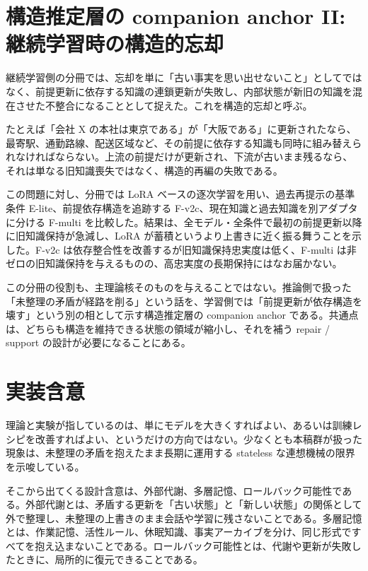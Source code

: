 \documentclass[12pt,a4paper]{article}
\begin{document}
\section{構造推定層の companion anchor II: 継続学習時の構造的忘却}\label{ux69cbux9020ux63a8ux5b9aux5c64ux306e-companion-anchor-ii-ux7d99ux7d9aux5b66ux7fd2ux6642ux306eux69cbux9020ux7684ux5fd8ux5374}

継続学習側の分冊では、忘却を単に「古い事実を思い出せないこと」としてではなく、前提更新に依存する知識の連鎖更新が失敗し、内部状態が新旧の知識を混在させた不整合になることとして捉えた。これを構造的忘却と呼ぶ。

たとえば「会社 X の本社は東京である」が「大阪である」に更新されたなら、最寄駅、通勤路線、配送区域など、その前提に依存する知識も同時に組み替えられなければならない。上流の前提だけが更新され、下流が古いまま残るなら、それは単なる旧知識喪失ではなく、構造的再編の失敗である。

この問題に対し、分冊では LoRA ベースの逐次学習を用い、過去再提示の基準条件 E-lite、前提依存構造を追跡する F-v2c、現在知識と過去知識を別アダプタに分ける F-multi を比較した。結果は、全モデル・全条件で最初の前提更新以降に旧知識保持が急減し、LoRA が蓄積というより上書きに近く振る舞うことを示した。F-v2c は依存整合性を改善するが旧知識保持忠実度は低く、F-multi は非ゼロの旧知識保持を与えるものの、高忠実度の長期保持にはなお届かない。

この分冊の役割も、主理論核そのものを与えることではない。推論側で扱った「未整理の矛盾が経路を削る」という話を、学習側では「前提更新が依存構造を壊す」という別の相として示す構造推定層の companion anchor である。共通点は、どちらも構造を維持できる状態の領域が縮小し、それを補う repair / support の設計が必要になることにある。

\section{実装含意}\label{ux5b9fux88c5ux542bux610f}

理論と実験が指しているのは、単にモデルを大きくすればよい、あるいは訓練レシピを改善すればよい、というだけの方向ではない。少なくとも本稿群が扱った現象は、未整理の矛盾を抱えたまま長期に運用する stateless な連想機械の限界を示唆している。

そこから出てくる設計含意は、外部代謝、多層記憶、ロールバック可能性である。外部代謝とは、矛盾する更新を「古い状態」と「新しい状態」の関係として外で整理し、未整理の上書きのまま会話や学習に残さないことである。多層記憶とは、作業記憶、活性ルール、休眠知識、事実アーカイブを分け、同じ形式ですべてを抱え込まないことである。ロールバック可能性とは、代謝や更新が失敗したときに、局所的に復元できることである。
\end{document}
